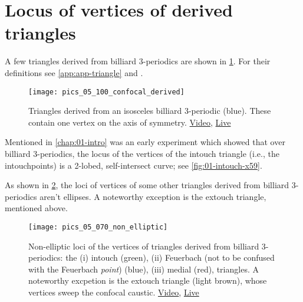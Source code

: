 \section{Locus of vertices of derived triangles}

A few triangles derived from billiard 3-periodics are shown in \cref{fig:05-derived-isosceles}. For their definitions see \cref{app:app-triangle} and \cite{mw}.

\begin{figure}
    \centering
    \texttt{[image: pics\_05\_100\_confocal\_derived]}
    \caption{Triangles derived from an isosceles billiard 3-periodic (blue). These contain one vertex on the axis of symmetry. \href{https://youtu.be/xyroRTEVNDc}{Video}, \href{https://bit.ly/3fyylD0}{Live}}
    \label{fig:05-derived-isosceles}
\end{figure}

Mentioned in \cref{chap:01-intro} was an early experiment which showed that over billiard 3-periodics, the locus of the vertices of the intouch triangle (i.e., the intouchpoints) is a 2-lobed, self-intersect curve; see \cref{fig:01-intouch-x59}.

As shown in \cref{fig:05-locus-x11-x100}, the loci of vertices of some other triangles derived from billiard 3-periodics aren't ellipses. A noteworthy exception is the extouch triangle, mentioned above.

\begin{figure}
    \centering
    \texttt{[image: pics\_05\_070\_non\_elliptic]}
    \caption{Non-elliptic loci of the vertices of triangles derived from billiard 3-periodics: the (i) intouch (green), (ii) Feuerbach (not to be confused with the Feuerbach {\em point}) (blue), (iii) medial (red), triangles. A noteworthy excpetion is the extouch triangle (light brown), whose vertices sweep the confocal caustic.
     \href{https://youtu.be/OGvCQbYqJyI}{Video}, \href{https://bit.ly/3orrSxQ}{Live}}
    \label{fig:05-locus-x11-x100}
\end{figure}
